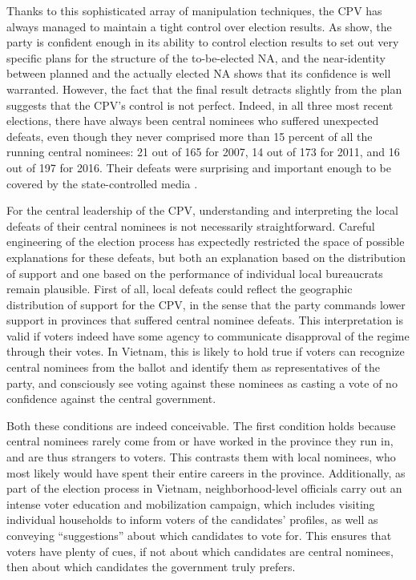 \documentclass[12pt]{article}\usepackage[]{graphicx}\usepackage[]{color}
\newcommand{\1}{\mathbbm{1}}
\begin{document}
Thanks to this sophisticated array of manipulation techniques, the CPV has always managed to maintain a tight control over election results. As \cite{MaleskySchuler2011} show, the party is confident enough in its ability to control election results to set out very specific plans for the structure of the to-be-elected NA, and the near-identity between planned and the actually elected NA shows that its confidence is well warranted. However, the fact that the final result detracts slightly from the plan suggests that the CPV's control is not perfect. Indeed, in all  three most recent elections, there have always been central nominees who suffered unexpected defeats, even though they never comprised more than 15 percent of all the running central nominees: 21 out of 165 for 2007, 14 out of 173 for 2011, and 16 out of 197 for 2016. Their defeats were surprising and important enough to be covered by the state-controlled media \citep[e.g][]{vov2016, laodong2016}.

For the central leadership of the CPV, understanding and interpreting the local defeats of their central nominees is not necessarily straightforward. Careful engineering of the election process has expectedly restricted the space of possible explanations for these defeats, but both an explanation based on the distribution of support and one based on the performance of individual local bureaucrats remain plausible. First of all, local defeats could reflect the geographic distribution of support for the CPV, in the sense that the party commands lower support in provinces that suffered central nominee defeats. This interpretation is valid if voters indeed have some agency to communicate disapproval of the regime through their votes. In Vietnam, this is likely to hold true if voters can recognize central nominees from the ballot and identify them as representatives of the party, and consciously see voting against these nominees as casting a vote of no confidence against the central government. 

Both these conditions are indeed conceivable. The first condition holds because central nominees rarely come from or have worked in the province they run in, and are thus strangers to voters. This contrasts them with local nominees, who most likely would have spent their entire careers in the province. Additionally, as part of the election process in Vietnam, neighborhood-level officials carry out an intense voter education and mobilization campaign, which includes visiting individual households to inform voters of the candidates' profiles, as well as conveying ``suggestions'' about which candidates to vote for. This ensures that voters have plenty of cues, if not about which candidates are central nominees, then about which candidates the government truly prefers. 
\end{document}
